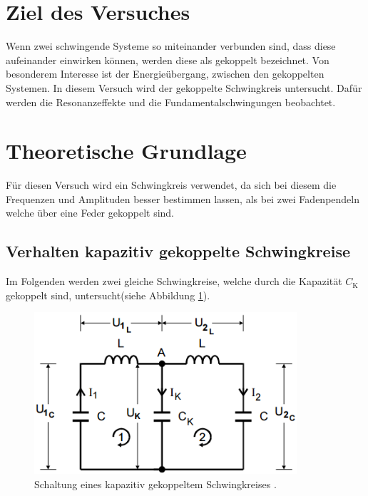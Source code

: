 \section{Ziel des Versuches}
Wenn zwei schwingende Systeme so miteinander verbunden sind, dass diese aufeinander einwirken können, werden diese als gekoppelt bezeichnet. Von besonderem Interesse ist der Energieübergang, zwischen den gekoppelten Systemen. In diesem Versuch wird der gekoppelte Schwingkreis untersucht. Dafür werden die Resonanzeffekte und die Fundamentalschwingungen beobachtet.

\section{Theoretische Grundlage}
\label{sec:Theorie}
Für diesen Versuch wird ein Schwingkreis verwendet, da sich bei diesem die Frequenzen und Amplituden besser bestimmen lassen, als bei zwei Fadenpendeln welche über eine Feder gekoppelt sind.

\subsection{Verhalten kapazitiv gekoppelte Schwingkreise}
Im Folgenden werden zwei gleiche Schwingkreise, welche durch die Kapazität  $C_\text{K}$ gekoppelt sind, untersucht(siehe Abbildung \ref{fig:GekSch}).

\begin{figure}[H] %
	\centering
	\includegraphics[height=6cm]{picture/GekoppelterSchwingkreis.PNG}
	\caption{Schaltung eines kapazitiv gekoppeltem Schwingkreises \cite{sample}.}
	\label{fig:GekSch}
\end{figure}

